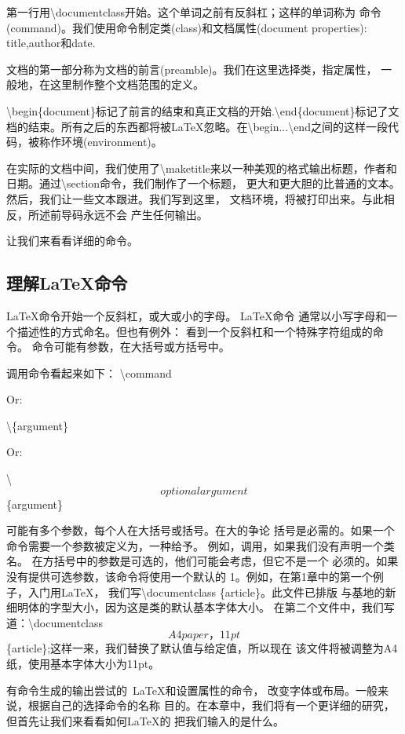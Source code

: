 第一行用\textbackslash documentclass开始。这个单词之前有反斜杠；这样的单词称为
命令(command)。我们使用命令制定类(class)和文档属性(document properties):
title,author和date.

文档的第一部分称为文档的前言(preamble)。我们在这里选择类，指定属性，
一般地，在这里制作整个文档范围的定义。

\textbackslash begin\{document\}标记了前言的结束和真正文档的开始.\textbackslash end\{document\}标记了文档的结束。所有之后的东西都将被LaTeX忽略。在\textbackslash begin...\textbackslash end之间的这样一段代码，被称作环境(environment)。

在实际的文档中间，我们使用了\textbackslash maketitle来以一种美观的格式输出标题，作者和日期。通过\textbackslash section命令，我们制作了一个标题，
更大和更大胆的比普通的文本。然后，我们让一些文本跟进。我们写到这里，
文档环境，将被打印出来。与此相反，所述前导码永远不会
产生任何输出。

让我们来看看详细的命令。
	\subsection{理解LaTeX命令}
	LaTeX命令开始一个反斜杠，或大或小的字母。 LaTeX命令
	通常以小写字母和一个描述性的方式命名。但也有例外：
	看到一个反斜杠和一个特殊字符组成的命令。
	命令可能有参数，在大括号或方括号中。

	调用命令看起来如下：
	\textbackslash command

	Or:

	\textbackslash \{argument\}

	Or:

	\textbackslash \[optional argument\] \{argument\}

	可能有多个参数，每个人在大括号或括号。在大的争论
	括号是必需的。如果一个命令需要一个参数被定义为，一种给予。
	例如，调用，如果我们没有声明一个类名。	
	在方括号中的参数是可选的，他们可能会考虑，但它不是一个
	必须的。如果没有提供可选参数，该命令将使用一个默认的
	1。例如，在第1章中的第一个例子，入门用LaTeX，
我们写\textbackslash documentclass \{article\}。此文件已排版
与基地的新细明体的字型大小，因为这是类的默认基本字体大小。
在第二个文件中，我们写道：\textbackslash documentclass \[ A4paper，11pt\]
\{article\};这样一来，我们替换了默认值与给定值，所以现在
该文件将被调整为A4纸，使用基本字体大小为11pt。

有命令生成的输出尝试的\ LaTeX和设置属性的命令，
改变字体或布局。一般来说，根据自己的选择命令的名称
目的。在本章中，我们将有一个更详细的研究，但首先让我们来看看如何LaTeX的
把我们输入的是什么。

